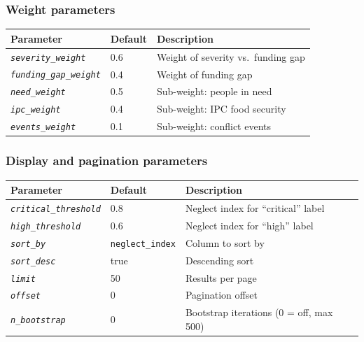 \documentclass[11pt,a4paper]{article}
\newcommand{\param}[1]{\texttt{\textit{#1}}}
\begin{document}
\subsubsection*{Weight parameters}

\begin{center}
  \begin{tabular}{lll}
    \toprule
    Parameter                    & Default & Description                         \\
    \midrule
    \param{severity\_weight}     & 0.6     & Weight of severity vs.\ funding gap \\
    \param{funding\_gap\_weight} & 0.4     & Weight of funding gap               \\
    \param{need\_weight}         & 0.5     & Sub-weight: people in need          \\
    \param{ipc\_weight}          & 0.4     & Sub-weight: IPC food security       \\
    \param{events\_weight}       & 0.1     & Sub-weight: conflict events         \\
    \bottomrule
  \end{tabular}
\end{center}

\subsubsection*{Display and pagination parameters}

\begin{center}
  \begin{tabular}{lll}
    \toprule
    Parameter                   & Default                 & Description                             \\
    \midrule
    \param{critical\_threshold} & 0.8                     & Neglect index for ``critical'' label    \\
    \param{high\_threshold}     & 0.6                     & Neglect index for ``high'' label        \\
    \param{sort\_by}            & \texttt{neglect\_index} & Column to sort by                       \\
    \param{sort\_desc}          & true                    & Descending sort                         \\
    \param{limit}               & 50                      & Results per page                        \\
    \param{offset}              & 0                       & Pagination offset                       \\
    \param{n\_bootstrap}        & 0                       & Bootstrap iterations (0 = off, max 500) \\
    \bottomrule
  \end{tabular}
\end{center}
\end{document}
